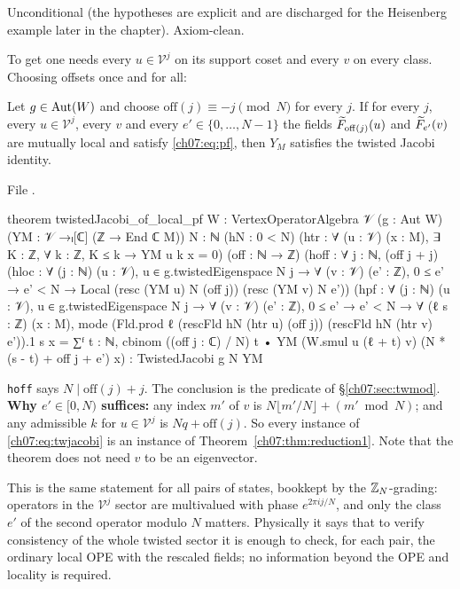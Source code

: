 \begin{status}
Unconditional (the hypotheses are explicit and are discharged for the Heisenberg example later
in the chapter). Axiom-clean.
\end{status}

To get  one needs every $u\in\mathcal V^j$ on its support coset and every $v$
on every class. Choosing offsets once and for all:

\begin{theorem}\label{ch07:thm:reduction}
Let $g\in\operatorname{Aut}(W)$ and choose $\mathrm{off}(j)\equiv -j\pmod N$ for every $j$. If for every $j$,
every $u\in\mathcal V^j$, every $v$ and every $e'\in\{0,\dots,N-1\}$ the fields
$\widetilde{F}_{\mathrm{off}(j)}(u)$ and $\widetilde{F}_{e'}(v)$ are mutually local and satisfy
\eqref{ch07:eq:pf}, then $Y_M$ satisfies the twisted Jacobi identity.
\end{theorem}

\noindent File .
\begin{leancode}
theorem twistedJacobi_of_local_pf {W : VertexOperatorAlgebra 𝒱} (g : Aut W)
    (YM : 𝒱 →ₗ[ℂ] (ℤ → End ℂ M)) {N : ℕ} (hN : 0 < N)
    (htr : ∀ (u : 𝒱) (x : M), ∃ K : ℤ, ∀ k : ℤ, K ≤ k → YM u k x = 0)
    (off : ℕ → ℤ) (hoff : ∀ j : ℕ, (off j + j) %
    (hloc : ∀ (j : ℕ) (u : 𝒱), u ∈ g.twistedEigenspace N j → ∀ (v : 𝒱) (e' : ℤ),
      0 ≤ e' → e' < N → Local (resc (YM u) N (off j)) (resc (YM v) N e'))
    (hpf : ∀ (j : ℕ) (u : 𝒱), u ∈ g.twistedEigenspace N j → ∀ (v : 𝒱) (e' : ℤ),
      0 ≤ e' → e' < N → ∀ (ℓ s : ℤ) (x : M),
      mode (Fld.prod ℓ (rescFld hN (htr u) (off j)) (rescFld hN (htr v) e')).1 s x
        = ∑ᶠ t : ℕ, cbinom ((off j : ℂ) / N) t •
            YM (W.smul u (ℓ + t) v) (N * (s - t) + off j + e') x) :
    TwistedJacobi g N YM
\end{leancode}

\begin{dictionary}
\verb|hoff| says $N\mid \mathrm{off}(j)+j$. The conclusion is the predicate of
\S\ref{ch07:sec:twmod}. \textbf{Why $e'\in[0,N)$ suffices:} any index $m'$ of $v$ is
$N\lfloor m'/N\rfloor + (m'\bmod N)$; and any admissible $k$ for $u\in\mathcal V^j$ is
$N q+\mathrm{off}(j)$. So every instance of \eqref{ch07:eq:twjacobi} is an instance of
Theorem~\ref{ch07:thm:reduction1}. Note that the theorem does not need $v$ to be an eigenvector.
\end{dictionary}

\begin{physics}
This is the same statement for all pairs of states, bookkept by the ${\mathbb{Z}}_N$-grading: operators in the $\mathcal V^j$ sector are multivalued with phase $e^{2\pi ij/N}$, and only the class $e'$ of the second operator modulo $N$ matters. Physically it says that to verify consistency of the whole twisted sector it is enough to check, for each pair, the ordinary local OPE with the rescaled fields; no information beyond the OPE and locality is required.
\end{physics}

